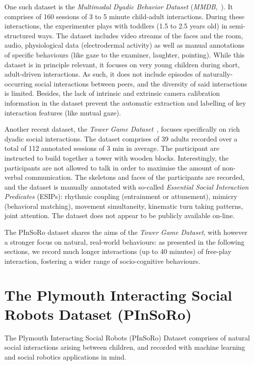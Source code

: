 \documentclass{article}
\begin{document}
One such dataset is the \emph{Multimodal Dyadic Behavior Dataset}
(\emph{MMDB},~\cite{rehg2013decoding}). It comprises of 160 sessions of 3 to 5
minute child-adult interactions. During these interactions, the experimenter
plays with toddlers (1.5 to 2.5 years old) in semi-structured ways.  The dataset
includes video streams of the faces and the room, audio, physiological data
(electrodermal activity) as well as manual annotations of specific behaviours
(like gaze to the examiner, laughter, pointing). While this dataset is in
principle relevant, it focuses on very young children during short, adult-driven
interactions. As such, it does not include episodes of naturally-occurring
social interactions between peers, and the diversity of said interactions is
limited. Besides, the lack of intrinsic and extrinsic camera calibration
information in the dataset prevent the automatic extraction and labelling of key
interaction features (like mutual gaze).

Another recent dataset, the \emph{Tower Game Dataset}~\cite{salter2015tower},
focuses specifically on rich dyadic social interactions. The dataset comprises
of 39 adults recorded over a total of 112 annotated sessions of 3 min in
average. The participant are instructed to build together a tower with wooden
blocks. Interestingly, the participants are not allowed to talk in order to
maximise the amount of non-verbal communication. The skeletons and faces of the
participants are recorded, and the dataset is manually annotated with so-called
\emph{Essential Social Interaction Predicates} (ESIPs): rhythmic coupling
(entrainment or attunement), mimicry (behavioral matching), movement
simultaneity, kinematic turn taking patterns, joint attention. The dataset does
not appear to be publicly available on-line.

The PInSoRo dataset shares the aims of the \emph{Tower Game Dataset}, with
however a stronger focus on natural, real-world behaviours: as presented in the
following sections, we record much longer interactions (up to 40 minutes) of
free-play interaction, fostering a wider range of socio-cognitive behaviours.

\section{The Plymouth Interacting Social Robots Dataset (PInSoRo)}

The Plymouth Interacting Social Robots (PInSoRo) Dataset comprises of natural
social interactions arising between children, and recorded with machine learning
and social robotics applications in mind.
\end{document}
